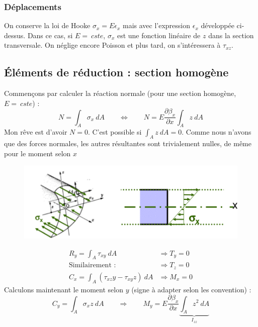 		\subsubsection{Déplacements}
		On conserve la loi de Hooke $\sigma_x = E\epsilon_x$ mais avec 
		l'expression $\epsilon_x$ développée ci-dessus. Dans ce cas, si 
		$E =\ cste$, $\sigma_x$ est une fonction linéaire de $z$ dans la 
		section transversale. On néglige encore Poisson et plus tard, on 
		s'intéressera à $\tau_{xz}$.
		
	\subsection{Éléments de réduction : section homogène}
	Commençons par calculer la réaction normale (pour une section homogène, 
	$E =\ cste$) :
	\begin{equation}
	N = \int_A\sigma_x\ dA\qquad\Leftrightarrow\qquad N = E\dfrac{\partial 
	\beta_x}{\partial x}\int_A z\ dA
	\end{equation}
	Mon rêve est d'avoir $N=0$. C'est possible si $\int_A z\ dA=0$. Comme 
	nous n'avons que des forces normales, les autres résultantes sont 
	trivialement nulles, de même pour le moment selon $x$
			\begin{figure}
	\vspace{-5mm}
	\includegraphics[scale=0.45]{ch4/image2.png}
	\end{figure}
	\begin{equation}
	\begin{array}{ll}
	R_y = \int_A \tau_{xy}\ dA &\Longrightarrow T_y = 0\\
	\text{Similairement : }&\Longrightarrow T_z = 0\\
	C_x = \int_A(\tau_{xz}y-\tau_{xy}z)\ dA &\Longrightarrow M_x=0
	\end{array}
	\end{equation}
	Calculons maintenant le moment selon $y$ (signe à adapter selon les 
	convention) : 
	\begin{equation}
	C_y = \int_A \sigma_xz\ dA\qquad\Longrightarrow\qquad M_y = E\dfrac{
	\partial \beta_x}{\partial x}\underbrace{\int_Az^2\ dA}_{I_{zz}}
	\end{equation}
